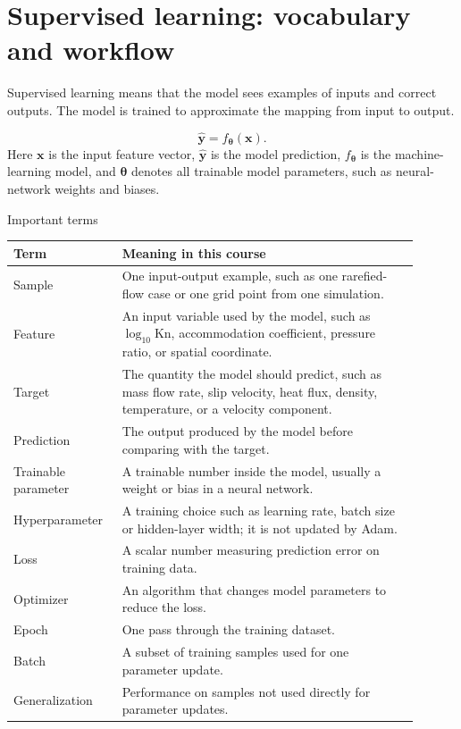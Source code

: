 \documentclass[11pt]{article}
\newcommand{\kn}{\mathrm{Kn}}
\newcommand{\btheta}{\bm{\theta}}
\newcommand{\bx}{\bm{x}}
\newcommand{\by}{\bm{y}}
\begin{document}
\section{Supervised learning: vocabulary and workflow}

Supervised learning means that the model sees examples of inputs and correct outputs.  The model is trained to approximate the mapping from input to output.

\begin{equation}
    \widehat{\by}=f_{\btheta}(\bx).
    \label{eq:model_mapping}
\end{equation}
Here $\bx$ is the input feature vector, $\widehat{\by}$ is the model prediction, $f_{\btheta}$ is the machine-learning model, and $\btheta$ denotes all trainable model parameters, such as neural-network weights and biases.

\begin{definitionbox}{Important terms}
\begin{longtable}{p{0.22\linewidth}p{0.68\linewidth}}
\toprule
Term & Meaning in this course \\
\midrule
Sample & One input-output example, such as one rarefied-flow case or one grid point from one simulation. \\
Feature & An input variable used by the model, such as $\log_{10}\kn$, accommodation coefficient, pressure ratio, or spatial coordinate. \\
Target & The quantity the model should predict, such as mass flow rate, slip velocity, heat flux, density, temperature, or a velocity component. \\
Prediction & The output produced by the model before comparing with the target. \\
Trainable parameter & A trainable number inside the model, usually a weight or bias in a neural network. \\
Hyperparameter & A training choice such as learning rate, batch size or hidden-layer width; it is not updated by Adam. \\
Loss & A scalar number measuring prediction error on training data. \\
Optimizer & An algorithm that changes model parameters to reduce the loss. \\
Epoch & One pass through the training dataset. \\
Batch & A subset of training samples used for one parameter update. \\
Generalization & Performance on samples not used directly for parameter updates. \\
\bottomrule
\end{longtable}
\end{definitionbox}
\end{document}
